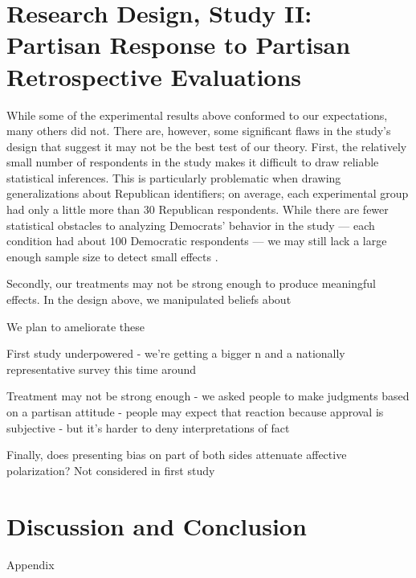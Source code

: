 \documentclass[12pt, letterpaper]{article}
\begin{document}
\section*{Research Design, Study II: Partisan Response to Partisan Retrospective Evaluations}

While some of the experimental results above conformed to our expectations, many others did not. There are, however, some significant flaws in the study's design that suggest it may not be the best test of our theory. First, the relatively small number of respondents in the study makes it difficult to draw reliable statistical inferences. This is particularly problematic when drawing generalizations about Republican identifiers; on average, each experimental group had only a little more than 30 Republican respondents. While there are fewer statistical obstacles to analyzing Democrats' behavior in the study --- each condition had about 100 Democratic respondents --- we may still lack a large enough sample size to detect small effects \citep[e.g.,][]{cohen_1992}. 

Secondly, our treatments may not be strong enough to produce meaningful effects. In the design above, we manipulated beliefs about 

We plan to ameliorate these 


First study underpowered - we're getting a bigger n and a nationally representative survey this time around 

Treatment may not be strong enough - we asked people to make judgments based on a partisan attitude - people may expect that reaction because approval is subjective - but it's harder to deny interpretations of fact

Finally, does presenting bias on part of both sides attenuate affective polarization? Not considered in first study


\section*{Discussion and Conclusion}

\clearpage




\clearpage

\appendix
\renewcommand{\thesection}{A \arabic{section}}
\renewcommand\thetable{\thesection.\arabic{table}}  
\renewcommand\thefigure{\thesection.\arabic{figure}}

\begin{center}
\Large{Appendix}
\end{center}
\end{document}
